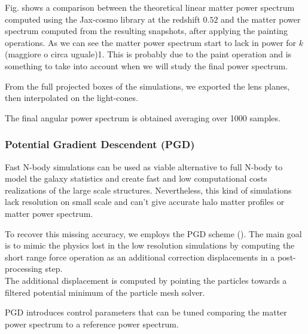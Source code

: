 \documentclass[twocolumn,twocolappendix]{aastex63}
\begin{document}
Fig. shows a comparison between the theoretical linear matter power spectrum computed using the Jax-cosmo library at the redshift $0.52$ and the matter power spectrum computed from the resulting snapshots, after applying the painting operations. As we can see the matter power spectrum start to lack in power for $k$(maggiore o circa uguale)1. This is probably due to the paint operation and is something to take into account when we will study the final power spectrum.



From the full projected boxes of the simulations, we exported the lens planes, then interpolated on the light-cones. 


The final angular power spectrum is obtained averaging over 1000 samples.


\subsubsection{Potential Gradient Descendent (PGD)}    
Fast N-body simulations can be used as viable alternative to full N-body to model the galaxy statistics and create fast and low computational costs realizations of the large scale structures. Nevertheless, this kind of simulations lack resolution on small scale and can't give accurate halo matter profiles or matter power spectrum. 


To recover this missing accuracy, we employs the PGD scheme (\cite{Dai_2018}). 
The main goal is to mimic the physics lost in the low resolution simulations by computing the short range force operation as an additional correction displacements in a post-processing step. \\
The additional displacement is computed by pointing the particles towards a filtered potential minimum of the particle mesh solver.


PGD introduces control parameters that can be tuned comparing the matter power spectrum to a reference power spectrum. 
\end{document}
